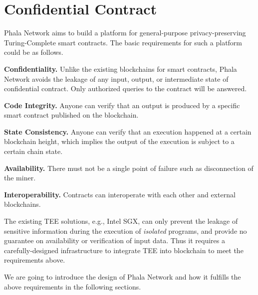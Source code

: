 \section{Confidential Contract}

Phala Network aims to build a platform for general-purpose privacy-preserving Turing-Complete smart contracts. The basic requirements for such a platform could be as follows.

\begin{icompact}
    \item \textbf{Confidentiality.}
    Unlike the existing blockchains for smart contracts, Phala Network avoids the leakage of any input, output, or intermediate state of confidential contract. Only authorized queries to the contract will be answered.

    \item \textbf{Code Integrity.}
    Anyone can verify that an output is produced by a specific smart contract published on the blockchain.

    \item \textbf{State Consistency.}
    Anyone can verify that an execution happened at a certain blockchain height, which implies the output of the execution is subject to a certain chain state.

    \item \textbf{Availability.}
    There must not be a single point of failure such as disconnection of the miner.

    \item \textbf{Interoperability.}
    Contracts can interoperate with each other and external blockchains.
\end{icompact}

The existing TEE solutions, e.g., Intel SGX, can only prevent the leakage of sensitive information during the execution of \textit{isolated} programs, and provide no guarantee on availability or verification of input data. Thus it requires a carefully-designed infrastructure to integrate TEE into blockchain to meet the requirements above.

We are going to introduce the design of Phala Network and how it fulfills the above requirements in the following sections.

